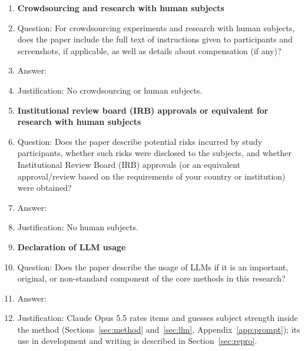 \begin{enumerate}
\item {\bf Crowdsourcing and research with human subjects}
  \item[] Question: For crowdsourcing experiments and research with human subjects, does the paper include the full text of instructions given to participants and screenshots, if applicable, as well as details about compensation (if any)?
  \item[] Answer: \answerNA{}
  \item[] Justification: No crowdsourcing or human subjects.

\item {\bf Institutional review board (IRB) approvals or equivalent for research with human subjects}
  \item[] Question: Does the paper describe potential risks incurred by study participants, whether such risks were disclosed to the subjects, and whether Institutional Review Board (IRB) approvals (or an equivalent approval/review based on the requirements of your country or institution) were obtained?
  \item[] Answer: \answerNA{}
  \item[] Justification: No human subjects.

\item {\bf Declaration of LLM usage}
  \item[] Question: Does the paper describe the usage of LLMs if it is an important, original, or non-standard component of the core methods in this research?
  \item[] Answer: \answerYes{}
  \item[] Justification: Claude Opus 5.5 rates items and guesses subject strength inside the method (Sections~\ref{sec:method} and~\ref{sec:llm}, Appendix~\ref{app:prompt}); its use in development and writing is described in Section~\ref{sec:repro}.

\end{enumerate}
